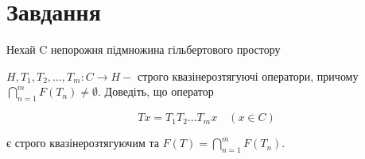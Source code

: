 
\chapter{Завдання \theHchapter}

\begin{tcolorbox}[title=Завдання]
    Нехай C непорожня підмножина гільбертового простору 
    
    
    $H, T_{1}, T_{2}, \ldots, T_{m}: C \rightarrow H-$ 
    строго квазінерозтягуючі оператори, причому 
    $\bigcap_{n=1}^{m} F\left(T_{n}\right) \neq \emptyset$. 
    Доведіть, що оператор

    $$
    T x=T_{1} T_{2} \ldots T_{m} x \quad(x \in C)
    $$

    є строго квазінерозтягуючим та $F(T)=\bigcap_{n=1}^{m} F\left(T_{n}\right)$.


\end{tcolorbox}

